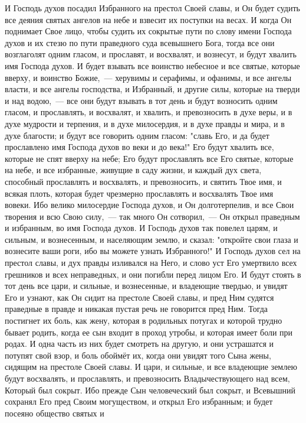 И Господь духов посадил Избранного на престол Своей славы, и Он будет
судить все деяния святых ангелов на небе и взвесит их поступки на весах.
И когда Он поднимает Свое лицо, чтобы судить их сокрытые пути по слову
имени Господа духов и их стезю по пути праведного суда всевышнего Бога, тогда
все они возглаголят одним гласом, и прославят, и восхвалят, и вознесут, и будут
хвалить имя Господа духов.
И будет взывать все воинство небесное и все святые, которые вверху, и
воинство Божие,~--- херувимы и серафимы, и офанимы, и все ангелы власти, и все
ангелы господства, и Избранный, и другие силы, которые на тверди и над водою,~---
все они будут взывать в тот день и будут возносить одним гласом, и прославлять,
и восхвалят, и хвалить, и превозносить в духе веры, и в духе мудрости и
терпения, и в духе милосердия, и в духе правды и мира, и в духе благости; и
будут все говорить одним гласом: "славь Его, и да будет прославлено имя Господа
духов во веки и до века!"
Его будут хвалить все, которые не спят вверху на небе; Его будут
прославлять все Его святые, которые на небе, и все избранные, живущие в саду
жизни, и каждый дух света, способный прославлять и восхвалять, и превозносить,
и святить Твое имя, и всякая плоть, которая будет чрезмерно прославлять и
восхвалять Твое имя вовеки.
Ибо велико милосердие Господа духов, и Он долготерпелив, и все Свои
творения и всю Свою силу,~--- так много Он сотворил,~--- Он открыл праведным и
избранным, во имя Господа духов.
И Господь духов так повелел царям, и сильным, и вознесенным, и
населяющим землю, и сказал: "откройте свои глаза и вознесите ваши роги, ибо вы
можете узнать Избранного!"
И Господь духов сел на престол славы, и дух правды изливался на Него,
и слово уст Его умертвило всех грешников и всех неправедных, и они погибли
перед лицом Его.
И будут стоять в тот день все цари, и сильные, и вознесенные, и
владеющие твердью, и увидят Его и узнают, как Он сидит на престоле Своей славы,
и пред Ним судятся праведные в правде и никакая пустая речь не говорится пред
Ним.
Тогда постигнет их боль, как жену, которая в родильных потугах и
которой трудно бывает родить, когда ее сын входит в проход утробы, и которая
имеет боли при родах.
И одна часть из них будет смотреть на другую, и они устрашатся и
потупят свой взор, и боль обоймёт их, когда они увидят того Сына жены, сидящим
на престоле Своей славы.
И цари, и сильные, и все владеющие землею будут восхвалять, и
прославлять, и превозносить Владычествующего над всем, Который был сокрыт.
Ибо прежде Сын человеческий был сокрыт, и Всевышний сохранял Его пред
Своим могуществом, и открыл Его избранным; и будет посеяно общество святых и
